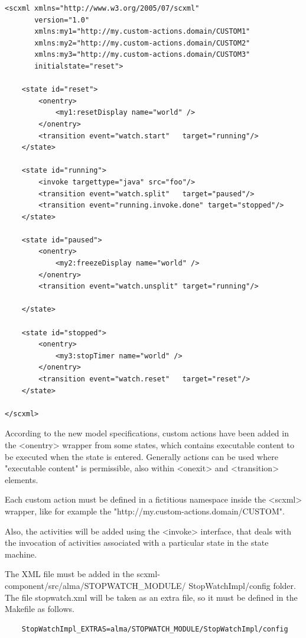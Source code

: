 \documentclass[]{article}
\begin{document}
\begin{lstlisting}
<scxml xmlns="http://www.w3.org/2005/07/scxml"
       version="1.0"
       xmlns:my1="http://my.custom-actions.domain/CUSTOM1"
       xmlns:my2="http://my.custom-actions.domain/CUSTOM2"
       xmlns:my3="http://my.custom-actions.domain/CUSTOM3"
       initialstate="reset">

    <state id="reset">
        <onentry>
            <my1:resetDisplay name="world" />
        </onentry>
        <transition event="watch.start"   target="running"/>
    </state>

    <state id="running">
        <invoke targettype="java" src="foo"/>
        <transition event="watch.split"   target="paused"/>
        <transition event="running.invoke.done" target="stopped"/>
    </state>

    <state id="paused">
        <onentry>
            <my2:freezeDisplay name="world" />
        </onentry>
        <transition event="watch.unsplit" target="running"/>

    </state>

    <state id="stopped">
        <onentry>
            <my3:stopTimer name="world" />
        </onentry>
        <transition event="watch.reset"   target="reset"/>
    </state>

</scxml>
\end{lstlisting}


According to the new model specifications, custom actions have been added in the \textsf{<onentry>} wrapper from some states, which contains executable content to be executed when the state is entered. Generally actions can be used where "executable content" is permissible, also within \textsf{<onexit>} and \textsf{<transition>} elements.

Each custom action must be defined in a fictitious namespace inside the \textsf{<scxml>} wrapper, like for example the \textsf{"http://my.custom-actions.domain/CUSTOM"}.

Also, the activities will be added using the \textsf{<invoke>} interface, that deals with the invocation of activities associated with a particular state in the state machine.

The XML file must be added in the \textsf{scxml-component/src/alma/STOPWATCH\_MODULE/ StopWatchImpl/config} folder. The file stopwatch.xml will be taken as an extra file, so it must be defined in the Makefile as follows. 


\begin{lstlisting}
	StopWatchImpl_EXTRAS=alma/STOPWATCH_MODULE/StopWatchImpl/config
\end{lstlisting}
\end{document}
